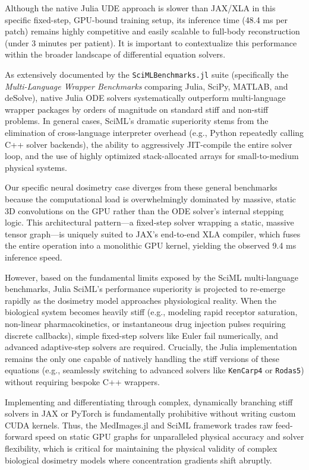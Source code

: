\documentclass[a4paper,10pt]{elsarticle}
\begin{document}
Although the native Julia UDE approach is slower than JAX/XLA in this specific fixed-step, GPU-bound training setup, its inference time (48.4 ms per patch) remains highly competitive and easily scalable to full-body reconstruction (under 3 minutes per patient). It is important to contextualize this performance within the broader landscape of differential equation solvers. 

As extensively documented by the \texttt{SciMLBenchmarks.jl} suite (specifically the \textit{Multi-Language Wrapper Benchmarks} comparing Julia, SciPy, MATLAB, and deSolve), native Julia ODE solvers systematically outperform multi-language wrapper packages by orders of magnitude on standard stiff and non-stiff problems. In general cases, SciML's dramatic superiority stems from the elimination of cross-language interpreter overhead (e.g., Python repeatedly calling C++ solver backends), the ability to aggressively JIT-compile the entire solver loop, and the use of highly optimized stack-allocated arrays for small-to-medium physical systems.

Our specific neural dosimetry case diverges from these general benchmarks because the computational load is overwhelmingly dominated by massive, static 3D convolutions on the GPU rather than the ODE solver's internal stepping logic. This architectural pattern---a fixed-step solver wrapping a static, massive tensor graph---is uniquely suited to JAX's end-to-end XLA compiler, which fuses the entire operation into a monolithic GPU kernel, yielding the observed 9.4 ms inference speed. 

However, based on the fundamental limits exposed by the SciML multi-language benchmarks, Julia SciML's performance superiority is projected to re-emerge rapidly as the dosimetry model approaches physiological reality. When the biological system becomes heavily stiff (e.g., modeling rapid receptor saturation, non-linear pharmacokinetics, or instantaneous drug injection pulses requiring discrete callbacks), simple fixed-step solvers like Euler fail numerically, and advanced adaptive-step solvers are required. Crucially, the Julia implementation remains the only one capable of natively handling the stiff versions of these equations (e.g., seamlessly switching to advanced solvers like \texttt{KenCarp4} or \texttt{Rodas5}) without requiring bespoke C++ wrappers. 

Implementing and differentiating through complex, dynamically branching stiff solvers in JAX or PyTorch is fundamentally prohibitive without writing custom CUDA kernels. Thus, the MedImages.jl and SciML framework trades raw feed-forward speed on static GPU graphs for unparalleled physical accuracy and solver flexibility, which is critical for maintaining the physical validity of complex biological dosimetry models where concentration gradients shift abruptly.
\end{document}
